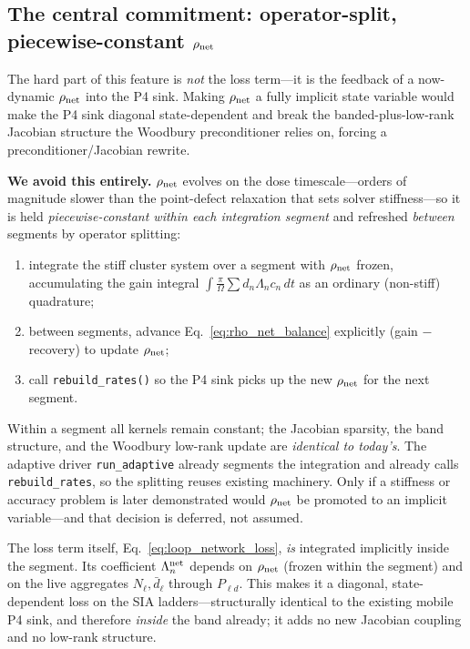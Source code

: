 \documentclass[11pt,a4paper]{article}
\begin{document}
\subsection*{The central commitment: operator-split, piecewise-constant
$\rho_{\rm net}$}

The hard part of this feature is \emph{not} the loss term---it is the feedback
of a now-dynamic $\rho_{\rm net}$ into the P4 sink.  Making $\rho_{\rm net}$ a
fully implicit state variable would make the P4 sink diagonal state-dependent
and break the banded-plus-low-rank Jacobian structure the Woodbury
preconditioner relies on, forcing a preconditioner/Jacobian rewrite.

\textbf{We avoid this entirely.}  $\rho_{\rm net}$ evolves on the dose
timescale---orders of magnitude slower than the point-defect relaxation that
sets solver stiffness---so it is held \emph{piecewise-constant within each
integration segment} and refreshed \emph{between} segments by operator
splitting:
\begin{enumerate}\itemsep2pt
  \item integrate the stiff cluster system over a segment with $\rho_{\rm net}$
        frozen, accumulating the gain integral
        $\int\!\frac{\pi}{\Omega}\sum d_n\Lambda_n c_n\,dt$ as an ordinary
        (non-stiff) quadrature;
  \item between segments, advance Eq.~\eqref{eq:rho_net_balance} explicitly
        (gain $-$ recovery) to update $\rho_{\rm net}$;
  \item call \texttt{rebuild\_rates()} so the P4 sink picks up the new
        $\rho_{\rm net}$ for the next segment.
\end{enumerate}
Within a segment all kernels remain constant; the Jacobian sparsity, the band
structure, and the Woodbury low-rank update are \emph{identical to today's}.
The adaptive driver \texttt{run\_adaptive} already segments the integration and
already calls \texttt{rebuild\_rates}, so the splitting reuses existing
machinery.  Only if a stiffness or accuracy problem is later demonstrated would
$\rho_{\rm net}$ be promoted to an implicit variable---and that decision is
deferred, not assumed.

The loss term itself, Eq.~\eqref{eq:loop_network_loss}, \emph{is} integrated
implicitly inside the segment.  Its coefficient $\Lambda_n^{\rm net}$ depends on
$\rho_{\rm net}$ (frozen within the segment) and on the live aggregates
$N_\ell,\bar d_\ell$ through $P_{\ell d}$.  This makes it a diagonal,
state-dependent loss on the SIA ladders---structurally identical to the
existing mobile P4 sink, and therefore \emph{inside} the band already; it adds
no new Jacobian coupling and no low-rank structure.
\end{document}
